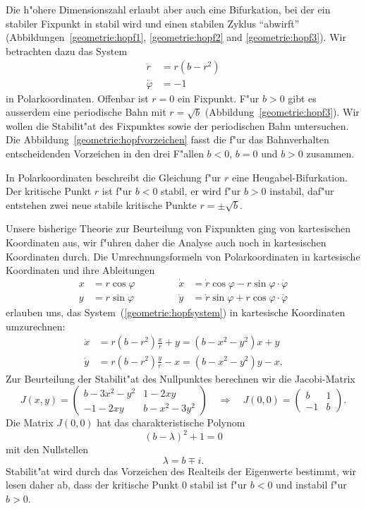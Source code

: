 Die h"ohere Dimensionszahl erlaubt aber auch eine Bifurkation, bei der
ein stabiler Fixpunkt in stabil wird und einen stabilen Zyklus ``abwirft''
(Abbildungen~\ref{geometrie:hopf1}, \ref{geometrie:hopf2} and
\ref{geometrie:hopf3}).
Wir betrachten dazu das System 
\begin{equation}
\begin{aligned}
\dot r      &= r(b-r^2)\\
\dot \varphi&= -1
\end{aligned}
\label{geometrie:hopfsystem}
\end{equation}
in Polarkoordinaten.
Offenbar ist $r=0$ ein Fixpunkt.
F"ur $b>0$ gibt es ausserdem eine periodische Bahn mit $r=\sqrt{b}$
(Abbildung~\ref{geometrie:hopf3}).
Wir wollen die Stabilit"at des Fixpunktes sowie der periodischen Bahn
untersuchen.
Die Abbildung~\ref{geometrie:hopfvorzeichen} fasst die f"ur das Bahnverhalten
entscheidenden Vorzeichen in den drei F"allen $b<0$, $b=0$ und $b>0$
zusammen.

In Polarkoordinaten beschreibt die Gleichung f"ur $r$ eine
Heugabel-Bifurkation.
Der kritische Punkt $r$ ist f"ur $b<0$ stabil, er wird f"ur $b>0$
instabil, daf"ur entstehen zwei neue stabile kritische Punkte
$r=\pm\sqrt{b}$.

Unsere bisherige Theorie zur Beurteilung von Fixpunkten ging von
kartesischen Koordinaten aus, wir f"uhren daher die Analyse auch noch
in kartesischen Koordinaten durch.
Die Umrechnungsformeln von Polarkoordinaten in kartesische Koordinaten
und ihre Ableitungen
\[
\begin{aligned}
x&=r\cos\varphi&&\qquad&\dot x&=\dot r\cos\varphi-r\sin\varphi\cdot\dot\varphi\\
y&=r\sin\varphi&&\qquad&\dot y&=\dot r\sin\varphi+r\cos\varphi\cdot\dot\varphi
\end{aligned}
\]
erlauben uns,
das System~(\ref{geometrie:hopfsystem}) in kartesische Koordinaten
umzurechnen:
\begin{equation}
\begin{aligned}
\dot x&=r(b-r^2)\frac{x}{r}+y=(b-x^2-y^2)x+y\\
\dot y&=r(b-r^2)\frac{y}{r}-x=(b-x^2-y^2)y-x.
\end{aligned}
\label{geometrie:hopf-kartesisch}
\end{equation}
Zur Beurteilung der Stabilit"at des Nullpunktes berechnen wir die
Jacobi-Matrix
\[
J(x,y)=
\begin{pmatrix}
b-3x^2-y^2&1-2xy\\
-1-2xy&b-x^2-3y^2
\end{pmatrix}
\quad\Rightarrow\quad
J(0,0)=\begin{pmatrix}
b&1\\-1&b
\end{pmatrix}.
\]
Die Matrix $J(0,0)$ hat das charakteristische Polynom
\[
(b-\lambda)^2+1=0
\]
mit den Nullstellen
\[
\lambda=b\mp i.
\]
Stabilit"at wird durch das Vorzeichen des Realteils der Eigenwerte
bestimmt, wir lesen daher ab, dass der kritische Punkt $0$ stabil
ist f"ur $b<0$ und instabil f"ur $b>0$.

